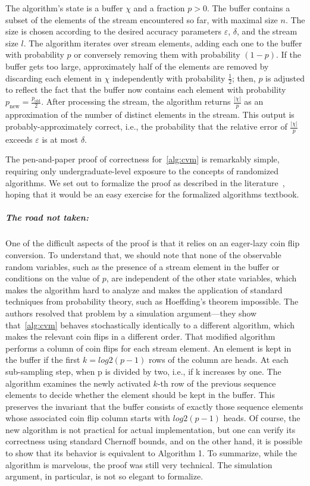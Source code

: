 The algorithm's state is a buffer $\chi$ and a fraction $p > 0$.
The buffer contains a subset of the elements of the stream encountered so far, with maximal size $n$.
The size is chosen according to the desired accuracy parameters $\varepsilon$, $\delta$, and the stream size $l$.
The algorithm iterates over stream elements, adding each one to the buffer with probability $p$ or conversely removing them with probability $(1-p)$.
If the buffer gets too large, approximately half of the elements are removed by discarding each element in $\chi$ independently with probability $\frac{1}{2}$; then, $p$ is adjusted to reflect the fact that the buffer now contains each element with probability $p_\text{new} = \frac{p_\text{old}}{2}$.
After processing the stream, the algorithm returns $\frac{|\chi|}{p}$ as an approximation of the number of distinct elements in the stream.
This output is probably-approximately correct, i.e., the probability that the relative error of $\frac{|\chi|}{p}$ exceeds $\varepsilon$ is at most $\delta$.

The pen-and-paper proof of correctness for~\cref{alg:cvm} is remarkably simple, requiring only undergraduate-level exposure to the concepts of randomized algorithms.
We set out to formalize the proof as described in the literature~\cite{DBLP:conf/esa/0001VM22}, hoping that it would be an easy exercise for the formalized algorithms textbook.

\subparagraph*{The road not taken:}
One of the difficult aspects of the proof is that it relies on an eager-lazy coin flip conversion.
To understand that, we should note that none of the observable random variables, such as the presence of a stream element in the buffer or conditions on the value of $p$, are independent of the other state variables, which makes the algorithm hard to analyze and makes the application of standard techniques from probability theory, such as Hoeffding's theorem impossible.
The authors resolved that problem by a simulation argument---they show that~\cref{alg:cvm} behaves stochastically identically to a different algorithm, which makes the relevant coin flips in a different order.
That modified algorithm performs a column of coin flips for each stream element.
An element is kept in the buffer if the first $k=log2(p-1)$ rows of the column are heads.
At each sub-sampling step, when p is divided by two, i.e., if k increases by one.
The algorithm examines the newly activated $k$-th row of the previous sequence elements to decide whether the element should be kept in the buffer.
This preserves the invariant that the buffer consists of exactly those sequence elements whose associated coin flip column starts with $log2(p-1)$ heads.
Of course, the new algorithm is not practical for actual implementation, but one can verify its correctness using standard Chernoff bounds, and on the other hand, it is possible to show that its behavior is equivalent to Algorithm 1.
To summarize, while the algorithm is marvelous, the proof was still very technical.
The simulation argument, in particular, is not so elegant to formalize.


